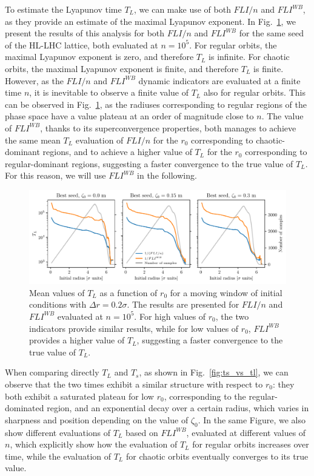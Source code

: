 To estimate the Lyapunov time $T_L$, we can make use of both $FLI/n$ and $FLI^{{WB}}$, as they provide an estimate of the maximal Lyapunov exponent. In Fig.~\ref{fig:lyapunov_time_fli_vs_wb}, we present the results of this analysis for both $FLI/n$ and $FLI^{{WB}}$ for the same seed of the HL-LHC lattice, both evaluated at $n=10^5$. For regular orbits, the maximal Lyapunov exponent is zero, and therefore $T_L$ is infinite. For chaotic orbits, the maximal Lyapunov exponent is finite, and therefore $T_L$ is finite. However, as the $FLI/n$ and $FLI^{WB}$ dynamic indicators are evaluated at a finite time $n$, it is inevitable to observe a finite value of $T_L$ also for regular orbits. This can be observed in Fig.~\ref{fig:lyapunov_time_fli_vs_wb}, as the radiuses corresponding to regular regions of the phase space have a value plateau at an order of magnitude close to $n$. The value of $FLI^{{WB}}$, thanks to its superconvergence properties, both manages to achieve the same mean $T_L$ evaluation of $FLI/n$ for the $r_0$ corresponding to chaotic-dominant regions, and to achieve a higher value of $T_L$ for the $r_0$ corresponding to regular-dominant regions, suggesting a faster convergence to the true value of $T_L$. For this reason, we will use $FLI^{{WB}}$ in the following.

\begin{figure}
    \centering
    \includegraphics[width=1\textwidth]{6_lhc_dynamic_indicators/figs/lyapunov_time_vs_lyapunov_wb_time.pdf}
    \caption{Mean values of $T_L$ as a function of $r_0$ for a moving window of initial conditions with $\Delta r = 0.2\sigma$. The results are presented for $FLI/n$ and $FLI^{{WB}}$ evaluated at $n=10^5$. For high values of $r_0$, the two indicators provide similar results, while for low values of $r_0$, $FLI^{{WB}}$ provides a higher value of $T_L$, suggesting a faster convergence to the true value of $T_L$.}
    \label{fig:lyapunov_time_fli_vs_wb}
\end{figure}

When comparing directly $T_L$ and $T_s$, as shown in Fig.~\ref{fig:ts_vs_tl}, we can observe that the two times exhibit a similar structure with respect to $r_0$: they both exhibit a saturated plateau for low $r_0$, corresponding to the regular-dominated region, and an exponential decay over a certain radius, which varies in sharpness and position depending on the value of $\zeta_0$. In the same Figure, we also show different evaluations of $T_L$ based on $FLI^{WB}$, evaluated at different values of $n$, which explicitly show how the evaluation of $T_L$ for regular orbits increases over time, while the evaluation of $T_L$ for chaotic orbits eventually converges to its true value.

